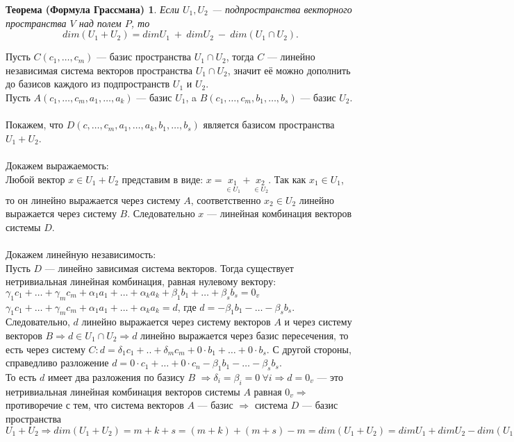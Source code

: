\newtheorem*{th10_9_1}{Теорема (Формула Грассмана)}\begin{th10_9_1}
	Если $U_1, U_2$ --- подпространства векторного пространства $V$ над полем $P$, то $$dim(U_1 + U_2) = dim U_1\  +\  dim U_2\  -\  dim (U_1 \cap U_2).$$
\end{th10_9_1}\begin{Proof}
	Пусть $C (c_1,\dots,c_m)$ --- базис пространства $U_1\cap U_2$, тогда $C$ --- линейно независимая система векторов пространства $U_1\cap U_2$, значит её можно дополнить до базисов каждого из подпространств $U_1$ и $U_2$.\\
	Пусть $A (c_1,\dots,c_m,a_1,\dots, a_k)$ --- базис $U_1$,
	a $B (c_1,\dots,c_m,b_1,\dots, b_s)$ --- базис $U_2$.\\\\
	Покажем, что $D (c,\dots,c_m,a_1,\dots,a_k,b_1,\dots,b_s)$ является базисом пространства $U_1 + U_2$.\\\\
	Докажем выражаемость:\\
	Любой вектор $x\in U_1 + U_2$ представим в виде: $x=\underset{\in U_1}{x_1} + \underset{\in U_2}{x_2}$. Так как $x_1 \in U_1$, то он линейно выражается через систему $A$, соответственно $x_2\in U_2$ линейно выражается через систему $B$. Следовательно $x$ --- линейная комбинация векторов системы $D$.\\\\
	Докажем линейную независимость:\\
	Пусть $D$ --- линейно зависимая система векторов. Тогда существует нетривиальная линейная комбинация, равная нулевому вектору:\\
	$\gamma_1 c_1 + \ldots +\gamma_m c_m +\alpha_1 a_1 + \ldots + \alpha_k a_k + \beta_1 b_1 + \ldots+\beta_s b_s = 0_v$\\
	$\gamma_1 c_1 + \ldots +\gamma_m c_m +\alpha_1 a_1 + \ldots + \alpha_k a_k = d$, где $d = -\beta_1 b_1 - \ldots-\beta_s b_s$.\\ Следовательно, $d$ линейно выражается через систему векторов $A$ и через систему векторов $B\Rightarrow d \in U_1 \cap U_2\Rightarrow d$ линейно выражается через базис пересечения, то есть через систему $C : d = \delta_1 c_1 + .. + \delta_m c_m + 0\cdot b_1 + \ldots + 0 \cdot b_s$. С другой стороны, справедливо разложение $d = 0\cdot c_1 + \ldots + 0\cdot c_n - \beta_1 b_1 - \ldots - \beta_s b_s$.\\
	То есть $d$ имеет два разложения по базису $B$ $\Rightarrow \delta_i = \beta_i = 0\ \forall i \Rightarrow d = 0_v$ --- это нетривиальная линейная комбинация векторов системы $A$ равная $0_v\Rightarrow$ противоречие с тем, что система векторов $A$ --- базис $\Rightarrow$ система $D$ --- базис пространства $U_1+U_2\Rightarrow dim(U_1 + U_2) = m + k + s = (m+k)+(m+s)-m = dim(U_1 + U_2) = dim U_1 + dim U_2 - dim(U_1\cap U_2)$
\end{Proof}
